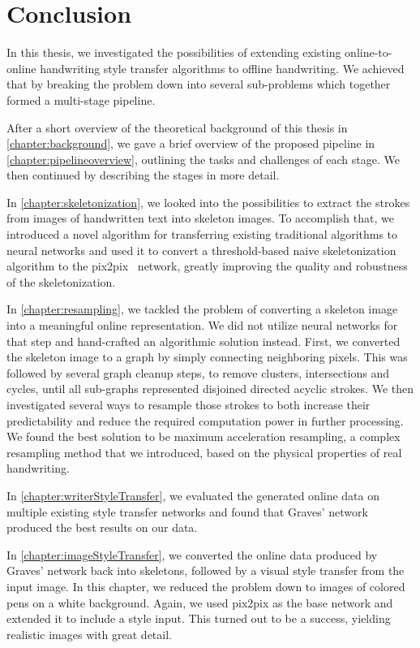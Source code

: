 \chapter{Conclusion}\label{chapter:conclusion}

In this thesis, we investigated the possibilities of extending existing online-to-online handwriting style transfer algorithms to offline handwriting.
We achieved that by breaking the problem down into several sub-problems which together formed a multi-stage pipeline.

After a short overview of the theoretical background of this thesis in \cref{chapter:background}, we gave a brief overview of the proposed pipeline in \cref{chapter:pipelineoverview}, outlining the tasks and challenges of each stage. We then continued by describing the stages in more detail.

In \cref{chapter:skeletonization}, we looked into the possibilities to extract the strokes from images of handwritten text into skeleton images. To accomplish that, we introduced a novel algorithm for transferring existing traditional algorithms to neural networks and used it to convert a threshold-based naive skeletonization algorithm to the \gls{pix2pix}~\cite{pix2pix} network, greatly improving the quality and robustness of the skeletonization.

In \cref{chapter:resampling}, we tackled the problem of converting a skeleton image into a meaningful online representation. We did not utilize neural networks for that step and hand-crafted an algorithmic solution instead. First, we converted the skeleton image to a graph by simply connecting neighboring pixels. This was followed by several graph cleanup steps, to remove clusters, intersections and cycles, until all sub-graphs represented disjoined directed acyclic strokes. We then investigated several ways to resample those strokes to both increase their predictability and reduce the required computation power in further processing. We found the best solution to be maximum acceleration resampling, a complex resampling method that we introduced, based on the physical properties of real handwriting.

In \cref{chapter:writerStyleTransfer}, we evaluated the generated online data on multiple existing style transfer networks and found that Graves' network~\cite{graves} produced the best results on our data.

In \cref{chapter:imageStyleTransfer}, we converted the online data produced by Graves' network back into skeletons, followed by a visual style transfer from the input image. In this chapter, we reduced the problem down to images of colored pens on a white background. Again, we used \gls{pix2pix} as the base network and extended it to include a style input. This turned out to be a success, yielding realistic images with great detail.

